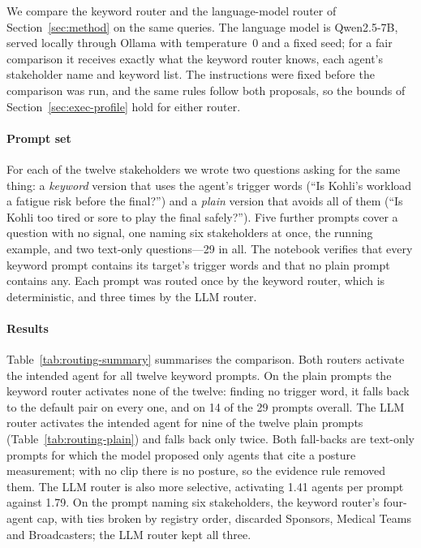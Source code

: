 \begin{table}[t]
  \centering
  \footnotesize
  \caption{Two queries traced through the graph. A: \emph{``Compare Kohli's
    cover drive vs his pull shot against fast bowlers in the powerplay''}.
    B: \emph{``Is Kohli's workload a fatigue risk before the final?''}. Each
    cell is what the stage wrote to the shared state; agent cells list every
    figure the agent cites. Stages whose output is identical for both queries
    (perception, Shot DNA, context retrieval, output) are omitted.}
  \label{tab:prompt-flow}
  
\end{table}

We compare the keyword router and the language-model router of
Section~\ref{sec:method} on the same queries. The language model is Qwen2.5-7B,
served locally through Ollama with temperature~0 and a fixed seed; for a fair
comparison it receives exactly what the keyword router knows, each agent's
stakeholder name and keyword list. The instructions were fixed before the
comparison was run, and the same rules follow both proposals, so the bounds of
Section~\ref{sec:exec-profile} hold for either router.

\paragraph{Prompt set}
For each of the twelve stakeholders we wrote two questions asking for the same
thing: a \emph{keyword} version that uses the agent's trigger words (``Is Kohli's
workload a fatigue risk before the final?'') and a \emph{plain} version that
avoids all of them (``Is Kohli too tired or sore to play the final safely?'').
Five further prompts cover a question with no signal, one naming six
stakeholders at once, the running example, and two text-only questions---29 in
all. The notebook verifies that every keyword prompt contains its target's
trigger words and that no plain prompt contains any. Each prompt was routed
once by the keyword router, which is deterministic, and three times by the LLM
router.

\paragraph{Results}
Table~\ref{tab:routing-summary} summarises the comparison. Both routers
activate the intended agent for all twelve keyword prompts. On the plain
prompts the keyword router activates none of the twelve: finding no trigger
word, it falls back to the default pair on every one, and on 14 of the 29
prompts overall. The LLM router activates the intended agent for nine of the
twelve plain prompts (Table~\ref{tab:routing-plain}) and falls back only twice.
Both fall-backs are text-only prompts for which the model proposed only agents
that cite a posture measurement; with no clip there is no posture, so the
evidence rule removed them. The LLM router is also more selective, activating
1.41 agents per prompt against 1.79. On the prompt naming six stakeholders, the
keyword router's four-agent cap, with ties broken by registry order, discarded
Sponsors, Medical Teams and Broadcasters; the LLM router kept all three.

